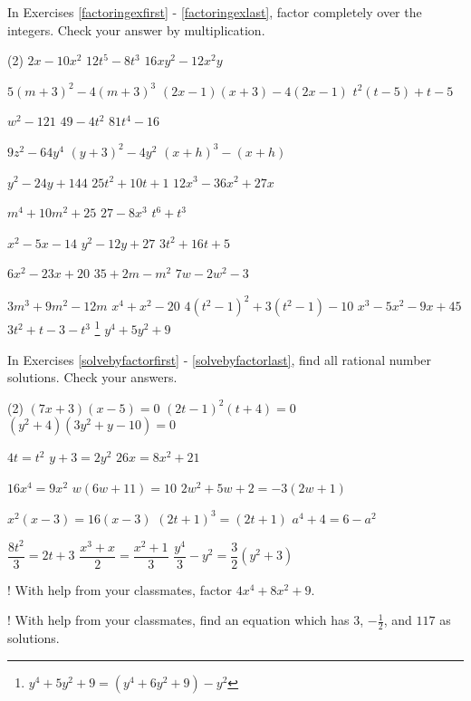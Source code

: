 \label{ExercisesforAppFactoring}

In Exercises \ref{factoringexfirst} - \ref{factoringexlast}, factor completely over the integers.  Check your answer by multiplication.

\begin{tasks}(2)
\task $2x - 10x^2$ \label{factoringexfirst}
\task $12t^5 - 8t^3$
\task $16xy^2 - 12x^2y$

\task $5(m+3)^2- 4(m+3)^3$
\task $(2x-1)(x+3) - 4(2x-1)$
\task $t^2(t-5) + t - 5$

\task $w^2 - 121$
\task $49 - 4t^2$
\task $81t^4 - 16$

\task $9z^2 - 64y^4$
\task $(y+3)^2 - 4y^2$
\task $(x+h)^3 - (x+h)$

\task $y^2 - 24y + 144$
\task $25t^2 + 10t + 1$
\task $12x^3 - 36x^2 + 27x$

\task $m^4 + 10m^2 + 25$
\task $27 - 8x^3$
\task $t^6 +t^3$

\task $x^2 - 5x - 14$
\task $y^2 - 12y + 27$
\task $3t^2 + 16t + 5$

\task $6x^2 - 23x + 20$
\task $35+2m - m^2$
\task $7w - 2w^2 - 3$

\task $3m^3 + 9m^2 - 12m$
\task $x^4 + x^2 - 20$
\task $4(t^2-1)^2 +3(t^2-1) - 10$
\task $x^3 - 5x^2 - 9x + 45$
\task $3t^2 + t - 3 - t^3$
\task\hspace{-0.1in}\footnote{$y^4 + 5y^2 + 9 = (y^4 + 6y^2 + 9) - y^2$} $y^4 + 5y^2 + 9$\label{factoringexlast}

\end{tasks}

In Exercises \ref{solvebyfactorfirst} - \ref{solvebyfactorlast},  find all rational number solutions.  Check your answers.

\begin{tasks}(2)
\task   $(7x+3)(x-5) = 0$ \label{solvebyfactorfirst}
\task   $(2t-1)^2 (t+4) = 0$
\task   $(y^2 + 4)(3y^2 +y - 10) = 0$

\task   $4t = t^2$
\task   $y+3 = 2y^2$
\task   $26x = 8x^2 + 21$  

\task $16x^4 = 9x^2$
\task $w(6w+11) = 10$
\task $2w^2 + 5w + 2 = - 3(2w+1)$

\task $x^2(x-3) = 16(x-3)$
\task $(2t+1)^3 = (2t+1)$
\task $a^4 + 4 = 6 - a^2$

\task $\dfrac{8t^2}{3} = 2t+3$
\task $\dfrac{x^3+x}{2} = \dfrac{x^2+1}{3}$
\task $\dfrac{y^4}{3} - y^2 = \dfrac{3}{2} (y^2 + 3)$ \label{solvebyfactorlast}

\task!  With help from your classmates, factor $4x^4 + 8x^2 + 9$.  

\task!  With help from your classmates, find an equation which has $3$, $-\frac{1}{2}$, and $117$ as solutions.  

\end{tasks}

